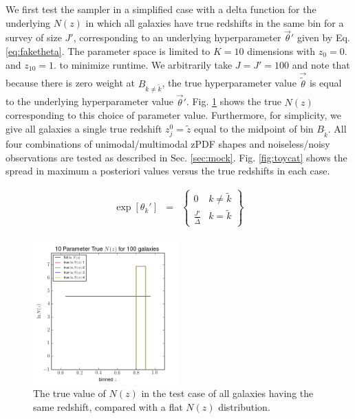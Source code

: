 \documentclass[preprint]{aastex}
\begin{document}
We first test the sampler in a simplified case with a delta function for the underlying $N(z)$ in which all galaxies have true redshifts in the same bin for a survey of size $J'$, corresponding to an underlying hyperparameter $\vec{\theta}'$ given by Eq. \ref{eq:faketheta}.  The parameter space is limited to $K=10$ dimensions with $z_{0}=0.$ and $z_{10}=1.$ to minimize runtime.  We arbitrarily take $J=J'=100$ and note that because there is zero weight at $B_{k\neq\tilde{k}}$, the true hyperparameter value $\vec{\tilde{\theta}}$ is equal to the underlying hyperparameter value $\vec{\theta}'$.  Fig. \ref{fig:deltatrueNz} shows the true $N(z)$ corresponding to this choice of parameter value.  Furthermore, for simplicity, we give all galaxies a single true redshift $z_{j}^{0}=\tilde{z}$ equal to the midpoint of bin $B_{\tilde{k}}$.  All four combinations of unimodal/multimodal zPDF shapes and noiseless/noisy observations are tested as described in Sec. \ref{sec:mock}.  Fig. \ref{fig:toycat} shows the spread in maximum a posteriori values versus the true redshifts in each case.

\begin{eqnarray}
\label{eq:faketheta}
\exp[\theta_{k}'] &=& \left\{\begin{array}{cc}0&k\neq\tilde{k}\\ \frac{J'}{\bar{\Delta}}&k=\tilde{k}\end{array}\right\}
\end{eqnarray}

\begin{figure}
\includegraphics[width=0.5\textwidth]{trueNz-toy.png}
\caption{The true value of $N(z)$ in the test case of all galaxies having the same redshift, compared with a flat $N(z)$ distribution.}
\label{fig:deltatrueNz}
\end{figure}
\end{document}
